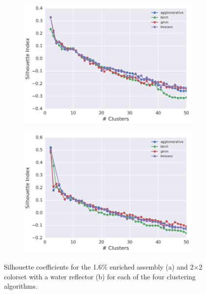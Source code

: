 \begin{figure}[h!]
\centering
\begin{subfigure}{\textwidth}
  \centering
  \includegraphics[width=0.9\linewidth]{figures/results/model-select/assm-16/silhouette-combined-U238-capture-1}
  \caption{}
  \label{fig:chap11-assm-16-silhouette-coeff}
\end{subfigure}
\begin{subfigure}{\textwidth}
  \centering
  \includegraphics[width=0.9\linewidth]{figures/results/model-select/reflector/silhouette-combined-U238-nu-fission-1}
  \caption{}
  \label{fig:chap11-refl-silhouette-coeff}
\end{subfigure}
\caption[Silhouette coefficient variation with the number of clusters]{Silhouette coefficients for the 1.6\% enriched assembly (a) and 2$\times$2 colorset with a water reflector (b) for each of the four clustering algorithms.}
\label{fig:chap11-silhouette-coeffs}
\end{figure}

